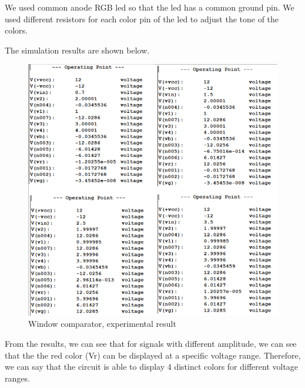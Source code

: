 \documentclass[conference]{IEEEtran}
\begin{document}
\par We used common anode RGB led so that the led has a common ground pin. We used different resistors for each color pin of the led 
to adjust the tone of the colors. 

\par The simulation results are shown below.
\begin{figure}[H]
    \centerline{\includegraphics[scale=0.4]{wcr.png}}
     \caption{Window comparator, experimental result}
 \end{figure} 
\par From the results, we can see that for signals with different amplitude, we can see that the the red color (Vr) can be displayed at 
a specific voltage range. Therefore, we can say that the circuit is able to display 4 distinct colors for different voltage ranges. 
\end{document}
